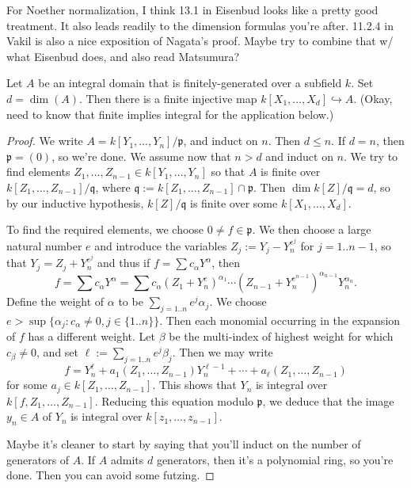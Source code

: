 \documentclass[reqno]{amsart}
\begin{document}
For Noether normalization, I think 13.1 in Eisenbud looks like a pretty good treatment.
It also leads readily to the dimension formulas you're after.
11.2.4 in Vakil is also a nice exposition of Nagata's proof.
Maybe try to combine that w/ what Eisenbud does, and also read Matsumura?


\begin{theorem}
  Let $A$ be an integral domain that is finitely-generated over
  a subfield $k$.  Set $d = \dim(A)$.  Then there is a finite
  injective map $k[X_1,\dotsc,X_d] \hookrightarrow A$.  (Okay,
  need to know that finite implies integral for the application
  below.)
\end{theorem}
\begin{proof}
  We write $A = k[Y_1,\dotsc,Y_n]/\mathfrak{p}$, and induct on
  $n$.  Then $d \leq n$.  If $d = n$, then $\mathfrak{p} = (0)$,
  so we're done.  We assume now that $n > d$ and induct on $n$.
  We try to find elements
  $Z_1, \dotsc, Z_{n-1} \in k[Y_1,\dotsc,Y_n]$ so that $A$ is
  finite over $k[Z_1,\dotsc,Z_{n-1}] / \mathfrak{q}$, where
  $\mathfrak{q} := k[Z_1,\dotsc,Z_{n-1}] \cap \mathfrak{p}$.
  Then $\dim k[Z]/\mathfrak{q} = d$,
  so by
  our inductive hypothesis,
  $k[Z]/\mathfrak{q}$
  is finite over some $k[X_1,\dotsc,X_d]$.

  To find the required elements,
  we choose $0 \neq f \in \mathfrak{p}$.
  We then choose a large natural number $e$
  and introduce the variables
  $Z_j := Y_j - Y_n^{e^j}$ for $j=1..n-1$,
  so that $Y_j = Z_j + Y_n^{e^j}$
  and thus if $f = \sum c_\alpha Y^\alpha$,
  then
  \[
    f = \sum c_\alpha Y^\alpha
    = \sum c_\alpha (Z_1 + Y_n^{e})^{\alpha_1}
    \dotsb (Z_{n-1} + Y_n^{e^{n-1}})^{\alpha_{n-1}}
    Y_n^{\alpha_n}.
  \]
  Define the weight of $\alpha$ to be
  $\sum_{j=1..n} e^j \alpha_j$.  We choose
  $e > \sup \{\alpha_j : c_\alpha \neq 0, j \in \{1..n\}\}$.
  Then each monomial occurring in the expansion of $f$ has a
  different weight.
  Let $\beta$ be the multi-index of highest weight
  for which $c_\beta \neq 0$,
  and set $\ell := \sum_{j=1..n} e^j \beta_j$.
  Then we may write
  \[
    f = Y_n^{\ell} + a_1(Z_1,\dotsc,Z_{n-1}) Y_n^{\ell-1} + \dotsb
    + a_\ell(Z_1,\dotsc,Z_{n-1})
  \]
  for some $a_j \in k[Z_1,\dotsc,Z_{n-1}]$.
  This shows that $Y_n$ is integral
  over $k[f,Z_1,\dotsc,Z_{n-1}]$.
  Reducing this equation modulo $\mathfrak{p}$,
  we deduce that the image $y_n \in A$
  of $Y_n$ is integral over $k[z_1,\dotsc,z_{n-1}]$.

  Maybe it's cleaner to start by saying that you'll induct on
  the number
  of generators of $A$.
  If $A$ admits $d$ generators,
  then it's a polynomial ring, so you're done.
  Then you can avoid some futzing.
\end{proof}
\end{document}
